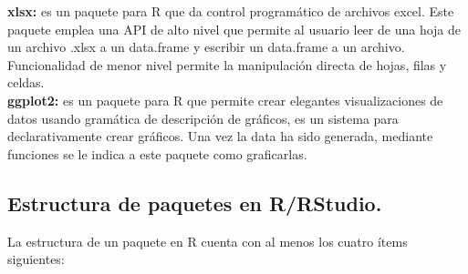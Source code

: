 \textbf{ xlsx:} es un paquete para R que da control program\'atico de archivos excel. Este paquete emplea una API de alto nivel que permite al usuario leer de una hoja de un archivo .xlsx a un data.frame y escribir un data.frame a un archivo. Funcionalidad de menor nivel permite la manipulaci\'on directa de hojas, filas y celdas.\\

\textbf{ggplot2:} es un paquete para R que permite crear elegantes visualizaciones de datos usando gram\'atica de descripci\'on de gr\'aficos, es un sistema para declarativamente crear gr\'aficos. Una vez la data ha sido generada, mediante funciones se le indica a este paquete como graficarlas.\\

\subsection{Estructura de paquetes en R/RStudio.}

La estructura de un paquete en R cuenta con al menos los cuatro \'items siguientes:

